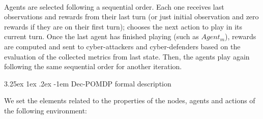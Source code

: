 \documentclass[conference]{IEEEtran}
\makeatletter
\renewcommand\paragraph{\@startsection{paragraph}{5}{\z@}%
  {3.25ex \@plus1ex \@minus.2ex}%
  {-1em}%
  {\normalfont\normalsize\bfseries}}
\makeatother
\begin{document}
\

Agents are selected following a sequential order. Each one receives last observations and rewards from their last turn (or just initial observation and zero rewards if they are on their first turn); chooses the next action to play in its current turn. Once the last agent has finished playing (such as $Agent_m$), rewards are computed and sent to cyber-attackers and cyber-defenders based on the evaluation of the collected metrics from last state. Then, the agents play again following the same sequential order for another iteration.


\paragraph{Dec-POMDP formal description}

We set the elements related to the properties of the nodes, agents and actions of the following environment:
\end{document}
